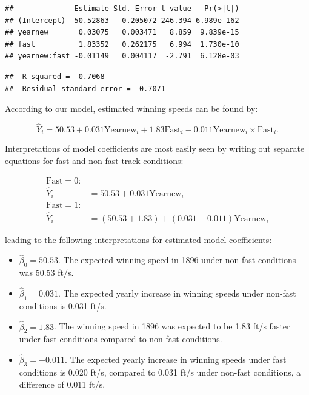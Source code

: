 \documentclass[
]{krantz}
\providecommand{\tightlist}{%
  \setlength{\itemsep}{0pt}\setlength{\parskip}{0pt}}
\begin{document}
\begin{verbatim}
##              Estimate Std. Error t value   Pr(>|t|)
## (Intercept)  50.52863   0.205072 246.394 6.989e-162
## yearnew       0.03075   0.003471   8.859  9.839e-15
## fast          1.83352   0.262175   6.994  1.730e-10
## yearnew:fast -0.01149   0.004117  -2.791  6.128e-03
\end{verbatim}

\begin{verbatim}
##  R squared =  0.7068 
##  Residual standard error =  0.7071
\end{verbatim}

According to our model, estimated winning speeds can be found by:

\begin{equation}
 \hat{Y}_{i}=50.53+0.031\textrm{Yearnew}_{i}+1.83\textrm{Fast}_{i}-0.011\textrm{Yearnew}_{i}\times\textrm{Fast}_{i}.
\label{eq:model5est}
\end{equation}

Interpretations of model coefficients are most easily seen by writing out separate equations for fast and non-fast track conditions:

\begin{align*}
 \textrm{Fast}=0: & \\
 \hat{Y}_{i} &= 50.53+0.031\textrm{Yearnew}_{i} \\
 \textrm{Fast}=1: & \\
 \hat{Y}_{i} &= (50.53+1.83)+(0.031-0.011)\textrm{Yearnew}_{i}
 \end{align*}

leading to the following interpretations for estimated model coefficients:

\begin{itemize}
\tightlist
\item
  \(\hat{\beta}_{0} = 50.53\). The expected winning speed in 1896 under non-fast conditions was 50.53 ft/s.
\item
  \(\hat{\beta}_{1} = 0.031\). The expected yearly increase in winning speeds under non-fast conditions is 0.031 ft/s.
\item
  \(\hat{\beta}_{2} = 1.83\). The winning speed in 1896 was expected to be 1.83 ft/s faster under fast conditions compared to non-fast conditions.
\item
  \(\hat{\beta}_{3} = -0.011\). The expected yearly increase in winning speeds under fast conditions is 0.020 ft/s, compared to 0.031 ft/s under non-fast conditions, a difference of 0.011 ft/s.
\end{itemize}
\end{document}
